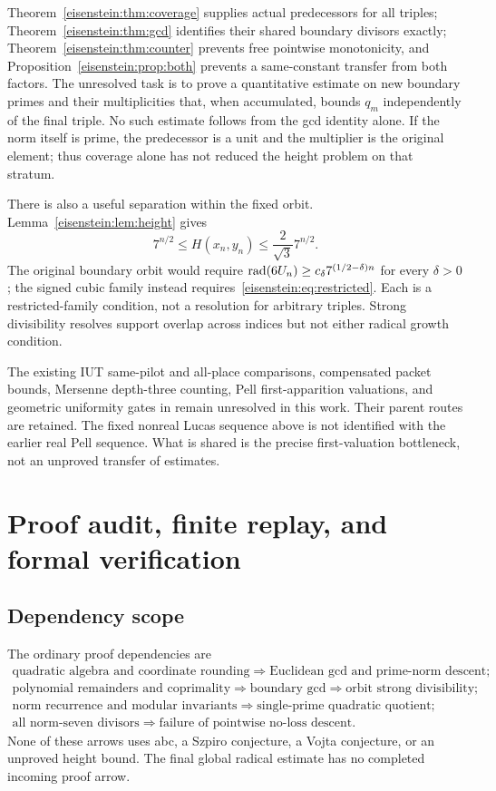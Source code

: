 Theorem~\ref{eisenstein:thm:coverage} supplies actual predecessors for all triples; Theorem~\ref{eisenstein:thm:gcd} identifies their shared boundary divisors exactly; Theorem~\ref{eisenstein:thm:counter} prevents free pointwise monotonicity, and Proposition~\ref{eisenstein:prop:both} prevents a same-constant transfer from both factors. The unresolved task is to prove a quantitative estimate on new boundary primes and their multiplicities that, when accumulated, bounds $q_m$ independently of the final triple. No such estimate follows from the gcd identity alone. If the norm itself is prime, the predecessor is a unit and the multiplier is the original element; thus coverage alone has not reduced the height problem on that stratum.

There is also a useful separation within the fixed orbit. Lemma~\ref{eisenstein:lem:height} gives
\[
7^{n/2}\le H(x_n,y_n)\le\frac2{\sqrt3}7^{n/2}.
\]
The original boundary orbit would require
$\operatorname{rad}(6U_n)\ge c_\delta7^{(1/2-\delta)n}$ for every $\delta>0$; the signed cubic family instead requires~\eqref{eisenstein:eq:restricted}. Each is a restricted-family condition, not a resolution for arbitrary triples. Strong divisibility resolves support overlap across indices but not either radical growth condition.

The existing IUT same-pilot and all-place comparisons, compensated packet bounds, Mersenne depth-three counting, Pell first-apparition valuations, and geometric uniformity gates in \cite{eisenstein:project} remain unresolved in this work. Their parent routes are retained. The fixed nonreal Lucas sequence above is not identified with the earlier real Pell sequence. What is shared is the precise first-valuation bottleneck, not an unproved transfer of estimates.

\section{Proof audit, finite replay, and formal verification}
\subsection{Dependency scope}
The ordinary proof dependencies are
\[
\begin{array}{c}
\text{quadratic algebra and coordinate rounding}
\Longrightarrow\text{Euclidean gcd and prime-norm descent};\\[2pt]
\text{polynomial remainders and coprimality}
\Longrightarrow\text{boundary gcd}
\Longrightarrow\text{orbit strong divisibility};\\[2pt]
\text{norm recurrence and modular invariants}
\Longrightarrow\text{single-prime quadratic quotient};\\[2pt]
\text{all norm-seven divisors}
\Longrightarrow\text{failure of pointwise no-loss descent}.
\end{array}
\]
None of these arrows uses abc, a Szpiro conjecture, a Vojta conjecture, or an unproved height bound. The final global radical estimate has no completed incoming proof arrow.

